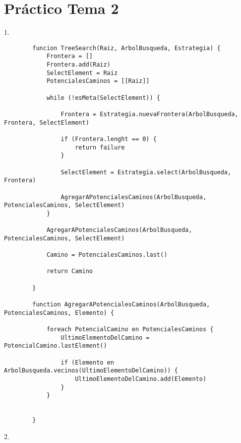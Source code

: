 \chapter{Práctico Tema 2}


1.\\

\begin{center}
	\begin{lstlisting}
		funcion TreeSearch(Raiz, ArbolBusqueda, Estrategia) {
			Frontera = []
			Frontera.add(Raiz)
			SelectElement = Raiz
			PotencialesCaminos = [[Raiz]]
			
			while (!esMeta(SelectElement)) {
				
				Frontera = Estrategia.nuevaFrontera(ArbolBusqueda, Frontera, SelectElement)
				
				if (Frontera.lenght == 0) {
					return failure
				}
				
				SelectElement = Estrategia.select(ArbolBusqueda, Frontera)
				
				AgregarAPotencialesCaminos(ArbolBusqueda, PotencialesCaminos, SelectElement)
			}
		
			AgregarAPotencialesCaminos(ArbolBusqueda, PotencialesCaminos, SelectElement)
		
			Camino = PotencialesCaminos.last()
		
			return Camino
			
		}
	
		function AgregarAPotencialesCaminos(ArbolBusqueda, PotencialesCaminos, Elemento) {
			
			foreach PotencialCamino en PotencialesCaminos {
				UltimoElementoDelCamino = PotencialCamino.lastElement()
				
				if (Elemento en ArbolBusqueda.vecinos(UltimoElementoDelCamino)) {
					UltimoElementoDelCamino.add(Elemento)
				}
			}
				
			
		}
	\end{lstlisting}
\end{center}

2.\\

